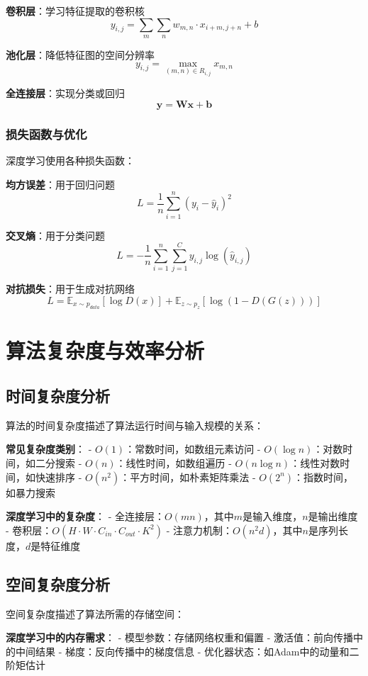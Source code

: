 \textbf{卷积层}：学习特征提取的卷积核
$$y_{i,j} = \sum_{m} \sum_{n} w_{m,n} \cdot x_{i+m,j+n} + b$$

\textbf{池化层}：降低特征图的空间分辨率
$$y_{i,j} = \max_{(m,n) \in R_{i,j}} x_{m,n}$$

\textbf{全连接层}：实现分类或回归
$$\mathbf{y} = \mathbf{W}\mathbf{x} + \mathbf{b}$$

\subsubsection{损失函数与优化}
深度学习使用各种损失函数：

\textbf{均方误差}：用于回归问题
$$L = \frac{1}{n} \sum_{i=1}^{n} (y_i - \hat{y}_i)^2$$

\textbf{交叉熵}：用于分类问题
$$L = -\frac{1}{n} \sum_{i=1}^{n} \sum_{j=1}^{C} y_{i,j} \log(\hat{y}_{i,j})$$

\textbf{对抗损失}：用于生成对抗网络
$$L = \mathbb{E}_{x \sim p_{data}}[\log D(x)] + \mathbb{E}_{z \sim p_z}[\log(1 - D(G(z)))]$$

\section{算法复杂度与效率分析}

\subsection{时间复杂度分析}

算法的时间复杂度描述了算法运行时间与输入规模的关系：

\textbf{常见复杂度类别}：
- $O(1)$：常数时间，如数组元素访问
- $O(\log n)$：对数时间，如二分搜索
- $O(n)$：线性时间，如数组遍历
- $O(n \log n)$：线性对数时间，如快速排序
- $O(n^2)$：平方时间，如朴素矩阵乘法
- $O(2^n)$：指数时间，如暴力搜索

\textbf{深度学习中的复杂度}：
- 全连接层：$O(mn)$，其中$m$是输入维度，$n$是输出维度
- 卷积层：$O(H \cdot W \cdot C_{in} \cdot C_{out} \cdot K^2)$
- 注意力机制：$O(n^2 d)$，其中$n$是序列长度，$d$是特征维度

\subsection{空间复杂度分析}

空间复杂度描述了算法所需的存储空间：

\textbf{深度学习中的内存需求}：
- 模型参数：存储网络权重和偏置
- 激活值：前向传播中的中间结果
- 梯度：反向传播中的梯度信息
- 优化器状态：如Adam中的动量和二阶矩估计

